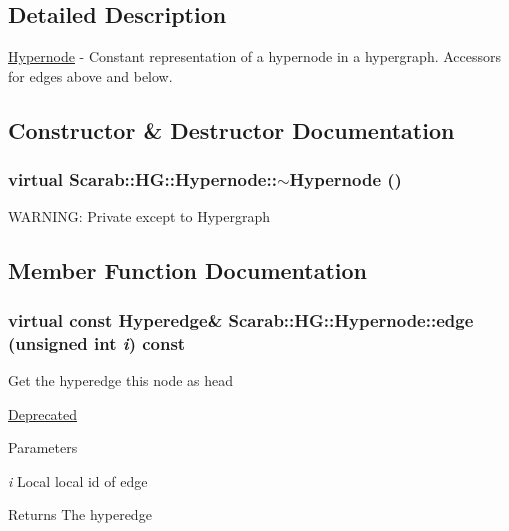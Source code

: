 \subsection{Detailed Description}
\hyperlink{classScarab_1_1HG_1_1Hypernode}{Hypernode} -\/ Constant representation of a hypernode in a hypergraph. Accessors for edges above and below. 

\subsection{Constructor \& Destructor Documentation}
\hypertarget{classScarab_1_1HG_1_1Hypernode_a0657cc96f62d29da3ae4b5b9bcab1ce6}{
\subsubsection[{$\sim$Hypernode}]{\setlength{\rightskip}{0pt plus 5cm}virtual Scarab::HG::Hypernode::$\sim$Hypernode ()}}
\label{classScarab_1_1HG_1_1Hypernode_a0657cc96f62d29da3ae4b5b9bcab1ce6}
WARNING: Private except to Hypergraph 

\subsection{Member Function Documentation}
\hypertarget{classScarab_1_1HG_1_1Hypernode_a3bface6832eb54a00d90e4fe8d1999f7}{
\subsubsection[{edge}]{\setlength{\rightskip}{0pt plus 5cm}virtual const {\bf Hyperedge}\& Scarab::HG::Hypernode::edge (unsigned int {\em i}) const}}
\label{classScarab_1_1HG_1_1Hypernode_a3bface6832eb54a00d90e4fe8d1999f7}
Get the hyperedge this node as head \begin{Desc}
\item[\hyperlink{deprecated__deprecated000009}{Deprecated}]\end{Desc}

\begin{DoxyParams}{Parameters}
\item[{\em i}]Local local id of edge\end{DoxyParams}
\begin{DoxyReturn}{Returns}
The hyperedge 
\end{DoxyReturn}


